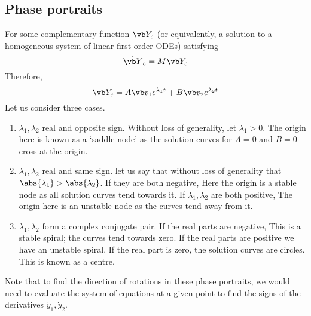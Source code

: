\subsection{Phase portraits}
For some complementary function \(\vb Y_c\) (or equivalently, a solution to a homogeneous system of linear first order ODEs) satisfying
\begin{equation}\label{phasematrix}
	\dot {\vb Y}_c = M\vb Y_c
\end{equation}
Therefore,
\[
	\vb Y_c = A\vb v_1 e^{\lambda_1 t} + B\vb v_2 e^{\lambda_2 t}
\]
Let us consider three cases.
\begin{enumerate}
	\item \(\lambda_1, \lambda_2\) real and opposite sign.
	      Without loss of generality, let \(\lambda_1 > 0\).
	      The origin here is known as a `saddle node' as the solution curves for \(A=0\) and \(B=0\) cross at the origin.
	\item \(\lambda_1, \lambda_2\) real and same sign.
	      let us say that without loss of generality that \(\abs{\lambda_1} > \abs{\lambda_2}\).
	      If they are both negative, %
	      Here the origin is a stable node as all solution curves tend towards it.
	      If \(\lambda_1, \lambda_2\) are both positive, %
	      The origin here is an unstable node as the curves tend away from it.
	\item \(\lambda_1, \lambda_2\) form a complex conjugate pair.
	      If the real parts are negative, %
	      This is a stable spiral; the curves tend towards zero.
	      If the real parts are positive we have an unstable spiral.
	      If the real part is zero, the solution curves are circles.
	      This is known as a centre.
\end{enumerate}
Note that to find the direction of rotations in these phase portraits, we would need to evaluate the system of equations at a given point to find the signs of the derivatives \(\dot y_1, \dot y_2\).

